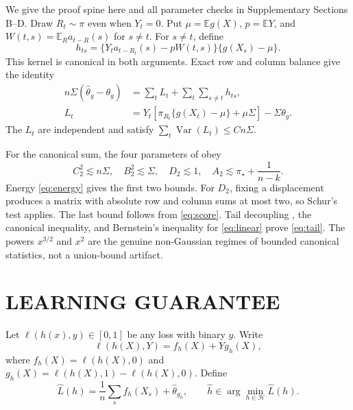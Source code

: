 \documentclass[twoside]{article}
\newcommand{\E}{\mathbb E}
\newcommand{\1}{\mathbf 1}
\newcommand{\cH}{\mathcal H}
\newcommand{\Var}{\operatorname{Var}}
\begin{document}
We give the proof spine here and all parameter checks in Supplementary Sections B--D. Draw $R_t\sim\pi$ even when $Y_t=0$. Put $\mu=\E g(X)$, $p=\E Y$, and $W(t,s)=\E_Ra_{t-R}(s)$ for $s\ne t$. For $s\ne t$, define
\begin{equation}
 h_{ts}=\{Y_ta_{t-R_t}(s)-pW(t,s)\}\{g(X_s)-\mu\}.
 \label{eq:kernel}
\end{equation}
This kernel is canonical in both arguments. Exact row and column balance give the identity
\begin{align}
 n\Sigma(\widehat\theta_g-\theta_g)
 &=\sum_tL_t+\sum_t\sum_{s\ne t}h_{ts},\label{eq:hoeffding}\\
 L_t&=Y_t[\pi_{R_t}\{g(X_t)-\mu\}+\mu\Sigma]-\Sigma\theta_g.
 \label{eq:linear}
\end{align}
The $L_t$ are independent and satisfy $\sum_t\Var(L_t)\le Cn\Sigma$.

For the canonical sum, the four parameters of \citet[Theorem 3.3]{gine2000exponential} obey
\begin{equation}
 C_2^2\lesssim n\Sigma,\quad B_2^2\lesssim\Sigma,
 \quad D_2\lesssim1,\quad A_2\lesssim\pi_\star+\frac1{n-k}.
 \label{eq:fourparams}
\end{equation}
Energy \eqref{eq:energy} gives the first two bounds. For $D_2$, fixing a displacement produces a matrix with absolute row and column sums at most two, so Schur's test applies. The last bound follows from \eqref{eq:score}. Tail decoupling \citep{delapena1995decoupling}, the canonical inequality, and Bernstein's inequality for \eqref{eq:linear} prove \eqref{eq:tail}. The powers $x^{3/2}$ and $x^2$ are the genuine non-Gaussian regimes of bounded canonical statistics, not a union-bound artifact.

\section{LEARNING GUARANTEE}

Let $\ell(h(x),y)\in[0,1]$ be any loss with binary $y$. Write
\begin{equation}
 \ell(h(X),Y)=f_h(X)+Yg_h(X),
 \label{eq:lossdecomp}
\end{equation}
where $f_h(X)=\ell(h(X),0)$ and $g_h(X)=\ell(h(X),1)-\ell(h(X),0)$. Define
\begin{equation}
 \widehat L(h)=\frac1n\sum_s f_h(X_s)+\widehat\theta_{g_h},
 \qquad \widehat h\in\arg\min_{h\in\cH}\widehat L(h).
 \label{eq:erm}
\end{equation}
\end{document}
